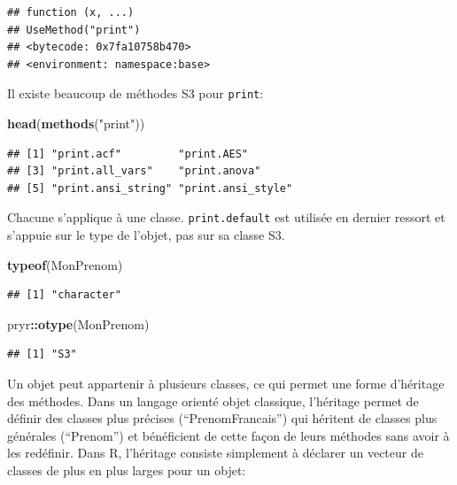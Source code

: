 \documentclass[
  12pt,
  french,
  a4paper,
  extrafontsizes,onecolumn,openright
  ]{memoir}
\newenvironment{Shaded}{\begin{snugshade}}{\end{snugshade}}
\newcommand{\KeywordTok}[1]{\textcolor[rgb]{0.13,0.29,0.53}{\textbf{#1}}}
\newcommand{\NormalTok}[1]{#1}
\newcommand{\OperatorTok}[1]{\textcolor[rgb]{0.81,0.36,0.00}{\textbf{#1}}}
\newcommand{\StringTok}[1]{\textcolor[rgb]{0.31,0.60,0.02}{#1}}
\begin{document}
\begin{verbatim}
## function (x, ...) 
## UseMethod("print")
## <bytecode: 0x7fa10758b470>
## <environment: namespace:base>
\end{verbatim}

\normalsize

Il existe beaucoup de méthodes S3 pour \texttt{print}:

\scriptsize

\begin{Shaded}
\begin{Highlighting}[]
\KeywordTok{head}\NormalTok{(}\KeywordTok{methods}\NormalTok{(}\StringTok{"print"}\NormalTok{))}
\end{Highlighting}
\end{Shaded}

\begin{verbatim}
## [1] "print.acf"         "print.AES"        
## [3] "print.all_vars"    "print.anova"      
## [5] "print.ansi_string" "print.ansi_style"
\end{verbatim}

\normalsize

Chacune s'applique à une classe. \texttt{print.default} est utilisée en dernier ressort et s'appuie sur le type de l'objet, pas sur sa classe S3.

\scriptsize

\begin{Shaded}
\begin{Highlighting}[]
\KeywordTok{typeof}\NormalTok{(MonPrenom)}
\end{Highlighting}
\end{Shaded}

\begin{verbatim}
## [1] "character"
\end{verbatim}

\begin{Shaded}
\begin{Highlighting}[]
\NormalTok{pryr}\OperatorTok{::}\KeywordTok{otype}\NormalTok{(MonPrenom)}
\end{Highlighting}
\end{Shaded}

\begin{verbatim}
## [1] "S3"
\end{verbatim}

\normalsize

Un objet peut appartenir à plusieurs classes, ce qui permet une forme d'héritage des méthodes.
Dans un langage orienté objet classique, l'héritage permet de définir des classes plus précises (\enquote{PrenomFrancais}) qui héritent de classes plus générales (\enquote{Prenom}) et bénéficient de cette façon de leurs méthodes sans avoir à les redéfinir.
Dans R, l'héritage consiste simplement à déclarer un vecteur de classes de plus en plus larges pour un objet:
\end{document}

